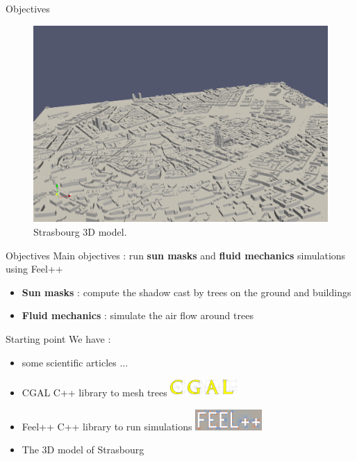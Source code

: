 \documentclass[10pt]{beamer}
\begin{document}
\begin{frame}{Objectives}
  \begin{figure}[H]
    \centering
    \includegraphics[width=1\textwidth]{images/stras_mesh.png}
    \caption{Strasbourg 3D model.}
  \end{figure}
\end{frame}

\begin{frame}{Objectives}
  Main objectives : run \textbf{sun masks} and \textbf{fluid mechanics} simulations using Feel++\cite{feel++} \\
  \vspace{0.5cm}

  \begin{itemize}
    \item<2-> \textbf{Sun masks} : compute the shadow cast by trees on the ground and buildings
    \item<3-> \textbf{Fluid mechanics} : simulate the air flow around trees
  \end{itemize}
\end{frame}

\begin{frame}{Starting point}
  We have :
  \begin{itemize}
    \item<2-> some scientific articles \cite{Verdie14} \cite{Verdie15} \cite{Stava14} ...
    \item <3-> CGAL\cite{cgal} C++ library to mesh trees \includegraphics[width=0.2\textwidth]{images/cgal_logo.png}
    \item <4-> Feel++\cite{feel++} C++ library to run simulations \includegraphics[width=0.2\textwidth]{images/feelpp.png}
    \item <5-> The 3D model of Strasbourg
  \end{itemize}
\end{frame}
\end{document}

